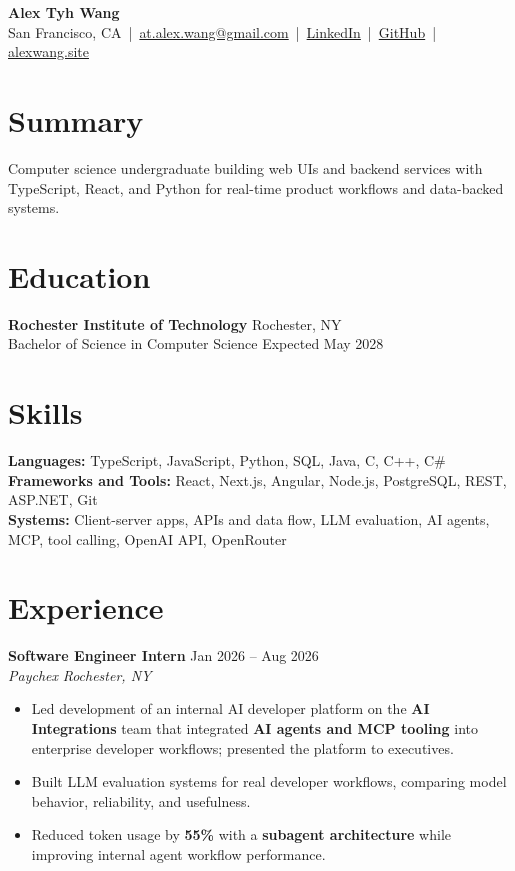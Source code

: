 \documentclass[10pt,letterpaper]{article}
\newif\ifresumeFirstRole
\newcommand{\resumeRole}[4]{%
  \ifresumeFirstRole
    \global\resumeFirstRolefalse
  \else
    \vspace{0pt plus 1fill}%
  \fi
  \textbf{#1} \hfill #2\\
  \textit{#3} \hfill \textit{#4}
}
\begin{document}
\begin{center}
{\Large \textbf{Alex Tyh Wang}}\\
San Francisco, CA \,|\, \href{mailto:at.alex.wang@gmail.com}{at.alex.wang@gmail.com} \,|\, \href{https://www.linkedin.com/in/alex-tyh-wang/}{LinkedIn} \,|\, \href{https://github.com/alextyhwang}{GitHub} \,|\, \href{https://alexwang.site}{alexwang.site}
\end{center}

\section*{Summary}
Computer science undergraduate building web UIs and backend services with TypeScript, React, and Python for real-time product workflows and data-backed systems.

\section*{Education}
\textbf{Rochester Institute of Technology} \hfill Rochester, NY\\
Bachelor of Science in Computer Science \hfill Expected May 2028

\section*{Skills}
\textbf{Languages:} TypeScript, JavaScript, Python, SQL, Java, C, C++, C\#\\
\textbf{Frameworks and Tools:} React, Next.js, Angular, Node.js, PostgreSQL, REST, ASP.NET, Git\\
\textbf{Systems:} Client-server apps, APIs and data flow, LLM evaluation, AI agents, MCP, tool calling, OpenAI API, OpenRouter

\section*{Experience}
\resumeRole{Software Engineer Intern}{Jan 2026 -- Aug 2026}{Paychex}{Rochester, NY}
\begin{itemize}
  \item Led development of an internal AI developer platform on the \textbf{AI Integrations} team that integrated \textbf{AI agents and MCP tooling} into enterprise developer workflows; presented the platform to executives.
  \item Built LLM evaluation systems for real developer workflows, comparing model behavior, reliability, and usefulness.
  \item Reduced token usage by \textbf{55\%} with a \textbf{subagent architecture} while improving internal agent workflow performance.
\end{itemize}
\end{document}
